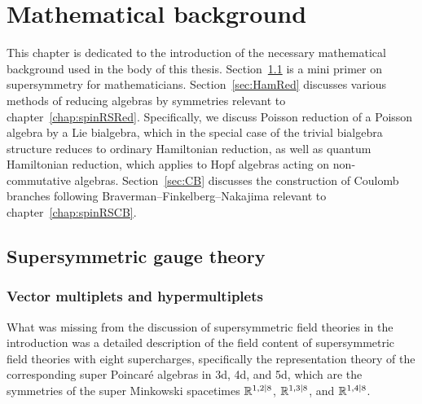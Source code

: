 

\chapter{Mathematical background}\label{chap:background}

\begin{chapterabstract}
	This chapter is dedicated to the introduction of the necessary mathematical background used in the body of this thesis. Section~\ref{sec:susy} is a mini primer on supersymmetry for mathematicians. Section~\ref{sec:HamRed} discusses various methods of reducing algebras by symmetries relevant to chapter~\ref{chap:spinRSRed}. Specifically, we discuss Poisson reduction of a Poisson algebra by a Lie bialgebra, which in the special case of the trivial bialgebra structure reduces to ordinary Hamiltonian reduction, as well as quantum Hamiltonian reduction, which applies to Hopf algebras acting on non-commutative algebras. Section~\ref{sec:CB} discusses the construction of Coulomb branches following Braverman--Finkelberg--Nakajima relevant to chapter~\ref{chap:spinRSCB}.
\end{chapterabstract}

\section{Supersymmetric gauge theory}\label{sec:susy}

\subsection{Vector multiplets and hypermultiplets}\label{subsection:multiplets}

What was missing from the discussion of supersymmetric field theories in the introduction was a detailed description of the field content of supersymmetric field theories with eight supercharges, specifically the representation theory of the corresponding super Poincaré algebras in 3d, 4d, and 5d, which are the symmetries of the super Minkowski spacetimes $\mathbb{R}^{1,2|8}$, $\mathbb{R}^{1,3|8}$, and $\mathbb{R}^{1,4|8}$.

